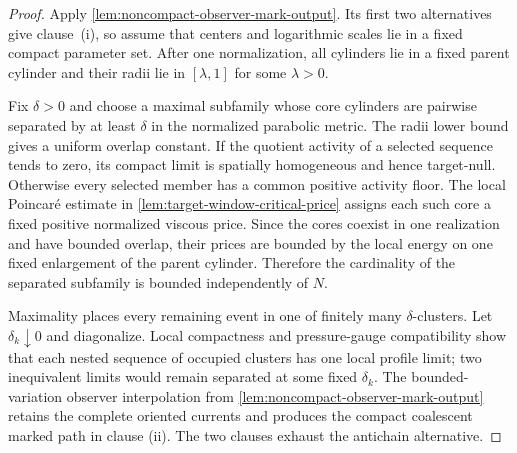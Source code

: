 \documentclass[11pt]{amsart}
\numberwithin{equation}{section}
\theoremstyle{plain}
\theoremstyle{definition}
\theoremstyle{remark}
\begin{document}
\begin{proof}
Apply \cref{lem:noncompact-observer-mark-output}.  Its first two alternatives
give clause~\textup{(i)}, so assume that centers and logarithmic scales lie in
a fixed compact parameter set.  After one normalization, all cylinders lie in
a fixed parent cylinder and their radii lie in \([\lambda,1]\) for some
\(\lambda>0\).

Fix \(\delta>0\) and choose a maximal subfamily whose core cylinders are
pairwise separated by at least \(\delta\) in the normalized parabolic metric.
The radii lower bound gives a uniform overlap constant.  If the quotient
activity of a selected sequence tends to zero, its compact limit is spatially
homogeneous and hence target-null.  Otherwise every selected member has a
common positive activity floor.  The local Poincar\'e estimate in
\cref{lem:target-window-critical-price} assigns each such core a fixed
positive normalized viscous price.  Since the cores coexist in one
realization and have bounded overlap, their prices are bounded by the local
energy on one fixed enlargement of the parent cylinder.  Therefore the
cardinality of the separated subfamily is bounded independently of \(N\).

Maximality places every remaining event in one of finitely many
\(\delta\)-clusters.  Let \(\delta_k\downarrow0\) and diagonalize.  Local
compactness and pressure-gauge compatibility show that each nested sequence
of occupied clusters has one local profile limit; two inequivalent limits
would remain separated at some fixed \(\delta_k\).  The bounded-variation
observer interpolation from
\cref{lem:noncompact-observer-mark-output} retains the complete oriented
currents and produces the compact coalescent marked path in clause
\textup{(ii)}.  The two clauses exhaust the antichain alternative.
\end{proof}
\end{document}

